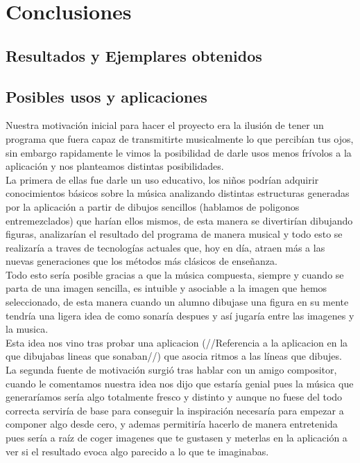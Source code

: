 \section{Conclusiones}

\subsection{Resultados y Ejemplares obtenidos}

\subsection{Posibles usos y aplicaciones}


Nuestra motivación inicial para hacer el proyecto era la ilusión de tener un programa que fuera capaz de transmitirte musicalmente lo que percibían tus ojos, sin embargo rapidamente le vimos la posibilidad de darle usos menos frívolos a la aplicación y nos planteamos distintas posibilidades.
\newline
\\La primera de ellas fue darle un uso educativo, los niños podrían adquirir conocimientos básicos sobre la música analizando distintas estructuras generadas por la aplicación a partir de dibujos sencillos (hablamos de poligonos entremezclados) que harían ellos mismos, de esta manera se divertirían dibujando figuras, analizarían el resultado del programa de manera musical y todo esto se realizaría a traves de tecnologías actuales que,  hoy en día, atraen más a las nuevas generaciones que los métodos más clásicos de enseñanza.
\newline
\\Todo esto sería posible gracias a que la música compuesta, siempre y cuando se parta de una imagen sencilla, es intuible y asociable a la imagen que hemos seleccionado, de esta manera cuando un alumno dibujase una figura en su mente tendría una ligera idea de como sonaría despues y así jugaría entre las imagenes y la musica.
\\Esta idea nos vino tras probar una aplicacion (//Referencia a la aplicacion en la que dibujabas lineas que sonaban//) que asocia ritmos a las líneas que dibujes.
\newline
\\La segunda fuente de motivación surgió tras hablar con un amigo compositor, cuando le comentamos nuestra idea nos dijo que estaría genial pues la música que generaríamos sería algo totalmente fresco y distinto y aunque no fuese del todo correcta serviría de base para conseguir la inspiración necesaría para empezar a componer algo desde cero, y ademas permitiría hacerlo de manera entretenida pues sería  a raíz de coger imagenes que te gustasen y meterlas en la aplicación a ver si el resultado evoca algo parecido a lo que te imaginabas.

